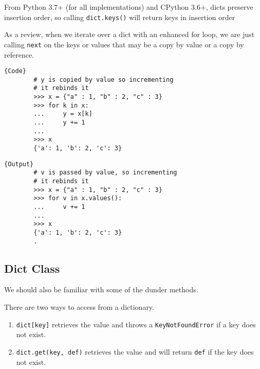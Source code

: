 \documentclass{article}
\begin{document}
    \begin{theorem}
      From Python 3.7+ (for all implementations) and CPython 3.6+, dicts preserve insertion order, so calling \texttt{dict.keys()} will return keys in insertion order
    \end{theorem}

    \begin{example}
      As a review, when we iterate over a dict with an enhanced for loop, we are just calling \texttt{next} on the keys or values that may be a copy by value or a copy by reference. 

      \noindent\begin{minipage}{.5\textwidth}
      \begin{lstlisting}[]{Code}
        # y is copied by value so incrementing 
        # it rebinds it
        >>> x = {"a" : 1, "b" : 2, "c" : 3}
        >>> for k in x: 
        ...     y = x[k]
        ...     y += 1
        ... 
        >>> x
        {'a': 1, 'b': 2, 'c': 3} 
      \end{lstlisting}
      \end{minipage}
      \hfill
      \begin{minipage}{.49\textwidth}
      \begin{lstlisting}[]{Output}
        # v is passed by value, so incrementing 
        # it rebinds it
        >>> x = {"a" : 1, "b" : 2, "c" : 3}
        >>> for v in x.values(): 
        ...     v += 1
        ... 
        >>> x
        {'a': 1, 'b': 2, 'c': 3} 
        .
      \end{lstlisting}
      \end{minipage}
    \end{example}

  \subsection{Dict Class}

    We should also be familiar with some of the dunder methods. 

    \begin{definition}[Get]
      There are two ways to access from a dictionary. 
      \begin{enumerate}
        \item \texttt{dict[key]} retrieves the value and throws a \texttt{KeyNotFoundError} if a key does not exist. 
        \item \texttt{dict.get(key, def)} retrieves the value and will return \texttt{def} if the key does not exist. 
      \end{enumerate}
    \end{definition}
    
\end{document}
